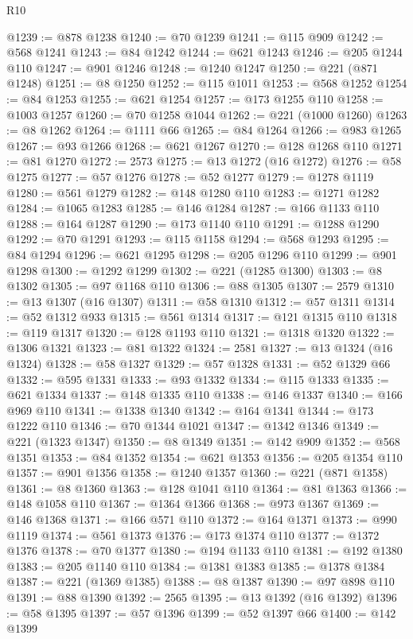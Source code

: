 \begin{lexlean}{R10}
\begin{coremodule}
@1239 := @878 @1238
@1240 := @70 @1239
@1241 := @115 @909
@1242 := @568 @1241
@1243 := @84 @1242
@1244 := @621 @1243
@1246 := @205 @1244 @110
@1247 := @901 @1246
@1248 := @1240 @1247
@1250 := @221 (@871 @1248)
@1251 := @8 @1250
@1252 := @115 @1011
@1253 := @568 @1252
@1254 := @84 @1253
@1255 := @621 @1254
@1257 := @173 @1255 @110
@1258 := @1003 @1257
@1260 := @70 @1258 @1044
@1262 := @221 (@1000 @1260)
@1263 := @8 @1262
@1264 := @1111 @66
@1265 := @84 @1264
@1266 := @983 @1265
@1267 := @93 @1266
@1268 := @621 @1267
@1270 := @128 @1268 @110
@1271 := @81 @1270
@1272 := 2573
@1275 := @13 @1272 (@16 @1272)
@1276 := @58 @1275
@1277 := @57 @1276
@1278 := @52 @1277
@1279 := @1278 @1119
@1280 := @561 @1279
@1282 := @148 @1280 @110
@1283 := @1271 @1282
@1284 := @1065 @1283
@1285 := @146 @1284
@1287 := @166 @1133 @110
@1288 := @164 @1287
@1290 := @173 @1140 @110
@1291 := @1288 @1290
@1292 := @70 @1291
@1293 := @115 @1158
@1294 := @568 @1293
@1295 := @84 @1294
@1296 := @621 @1295
@1298 := @205 @1296 @110
@1299 := @901 @1298
@1300 := @1292 @1299
@1302 := @221 (@1285 @1300)
@1303 := @8 @1302
@1305 := @97 @1168 @110
@1306 := @88 @1305
@1307 := 2579
@1310 := @13 @1307 (@16 @1307)
@1311 := @58 @1310
@1312 := @57 @1311
@1314 := @52 @1312 @933
@1315 := @561 @1314
@1317 := @121 @1315 @110
@1318 := @119 @1317
@1320 := @128 @1193 @110
@1321 := @1318 @1320
@1322 := @1306 @1321
@1323 := @81 @1322
@1324 := 2581
@1327 := @13 @1324 (@16 @1324)
@1328 := @58 @1327
@1329 := @57 @1328
@1331 := @52 @1329 @66
@1332 := @595 @1331
@1333 := @93 @1332
@1334 := @115 @1333
@1335 := @621 @1334
@1337 := @148 @1335 @110
@1338 := @146 @1337
@1340 := @166 @969 @110
@1341 := @1338 @1340
@1342 := @164 @1341
@1344 := @173 @1222 @110
@1346 := @70 @1344 @1021
@1347 := @1342 @1346
@1349 := @221 (@1323 @1347)
@1350 := @8 @1349
@1351 := @142 @909
@1352 := @568 @1351
@1353 := @84 @1352
@1354 := @621 @1353
@1356 := @205 @1354 @110
@1357 := @901 @1356
@1358 := @1240 @1357
@1360 := @221 (@871 @1358)
@1361 := @8 @1360
@1363 := @128 @1041 @110
@1364 := @81 @1363
@1366 := @148 @1058 @110
@1367 := @1364 @1366
@1368 := @973 @1367
@1369 := @146 @1368
@1371 := @166 @571 @110
@1372 := @164 @1371
@1373 := @990 @1119
@1374 := @561 @1373
@1376 := @173 @1374 @110
@1377 := @1372 @1376
@1378 := @70 @1377
@1380 := @194 @1133 @110
@1381 := @192 @1380
@1383 := @205 @1140 @110
@1384 := @1381 @1383
@1385 := @1378 @1384
@1387 := @221 (@1369 @1385)
@1388 := @8 @1387
@1390 := @97 @898 @110
@1391 := @88 @1390
@1392 := 2565
@1395 := @13 @1392 (@16 @1392)
@1396 := @58 @1395
@1397 := @57 @1396
@1399 := @52 @1397 @66
@1400 := @142 @1399

\end{coremodule}
\end{lexlean}

